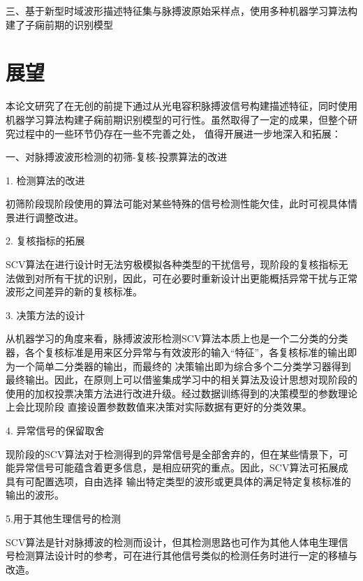 三、基于新型时域波形描述特征集与脉搏波原始采样点，使用多种机器学习算法构建了子痫前期的识别模型


\section{展望}
本论文研究了在无创的前提下通过从光电容积脉搏波信号构建描述特征，同时使用机器学习算法构建子痫前期识别模型的可行性。虽然取得了一定的成果，但整个研究过程中的一些环节仍存在一些不完善之处，
值得开展进一步地深入和拓展：

一、对脉搏波波形检测的初筛-复核-投票算法的改进

1. 检测算法的改进

初筛阶段现阶段使用的算法可能对某些特殊的信号检测性能欠佳，此时可视具体情景进行调整改进。

2. 复核指标的拓展

SCV算法在进行设计时无法穷极模拟各种类型的干扰信号，现阶段的复核指标无法做到对所有干扰的识别，因此，可在必要时重新设计出更能概括异常干扰与正常波形之间差异的新的复核标准。

3. 决策方法的设计

从机器学习的角度来看，脉搏波波形检测SCV算法本质上也是一个二分类的分类器，各个复核标准是用来区分异常与有效波形的输入“特征”，各复核标准的输出即为一个简单二分类器的输出，而最终的
决策输出即为综合多个二分类学习器得到最终输出。因此，在原则上可以借鉴集成学习中的相关算法及设计思想对现阶段的使用的加权投票决策方法进行改进升级。经过数据训练得到的决策模型的参数理论上会比现阶段
直接设置参数数值来决策对实际数据有更好的分类效果。

4. 异常信号的保留取舍

现阶段的SCV算法对于检测得到的异常信号是全部舍弃的，但在某些情景下，可能异常信号可能蕴含着更多信息，是相应研究的重点。因此，SCV算法可拓展成具有可配置选项，自由选择
输出特定类型的波形或更具体的满足特定复核标准的输出的波形。

5.用于其他生理信号的检测

SCV算法是针对脉搏波的检测而设计，但其检测思路也可作为其他人体电生理信号检测算法设计时的参考，可在进行其他信号类似的检测任务时进行一定的移植与改造。
